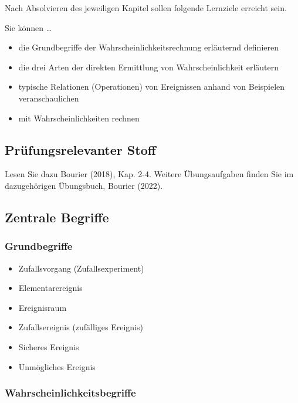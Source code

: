 \documentclass[
  a4paper,
  DIV=11]{scrreprt}
\providecommand{\tightlist}{%
  \setlength{\itemsep}{0pt}\setlength{\parskip}{0pt}}\usepackage{longtable,booktabs,array}
\theoremstyle{definition}
\theoremstyle{remark}
\begin{document}
Nach Absolvieren des jeweiligen Kapitel sollen folgende Lernziele
erreicht sein.

Sie können \ldots{}

\begin{itemize}
\tightlist
\item
  die Grundbegriffe der Wahrscheinlichkeitsrechnung erläuternd
  definieren
\item
  die drei Arten der direkten Ermittlung von Wahrscheinlichkeit
  erläutern
\item
  typische Relationen (Operationen) von Ereignissen anhand von
  Beispielen veranschaulichen
\item
  mit Wahrscheinlichkeiten rechnen
\end{itemize}

\hypertarget{pruxfcfungsrelevanter-stoff}{%
\subsection{Prüfungsrelevanter
Stoff}\label{pruxfcfungsrelevanter-stoff}}

Lesen Sie dazu Bourier (2018), Kap. 2-4. Weitere Übungsaufgaben finden
Sie im dazugehörigen Übungsbuch, Bourier (2022).

\hypertarget{zentrale-begriffe}{%
\subsection{Zentrale Begriffe}\label{zentrale-begriffe}}

\hypertarget{grundbegriffe}{%
\subsubsection{Grundbegriffe}\label{grundbegriffe}}

\begin{itemize}
\tightlist
\item
  Zufallsvorgang (Zufallsexperiment)
\item
  Elementarereignis
\item
  Ereignisraum
\item
  Zufallsereignis (zufälliges Ereignis)
\item
  Sicheres Ereignis
\item
  Unmögliches Ereignis
\end{itemize}

\hypertarget{wahrscheinlichkeitsbegriffe}{%
\subsubsection{Wahrscheinlichkeitsbegriffe}\label{wahrscheinlichkeitsbegriffe}}
\end{document}

